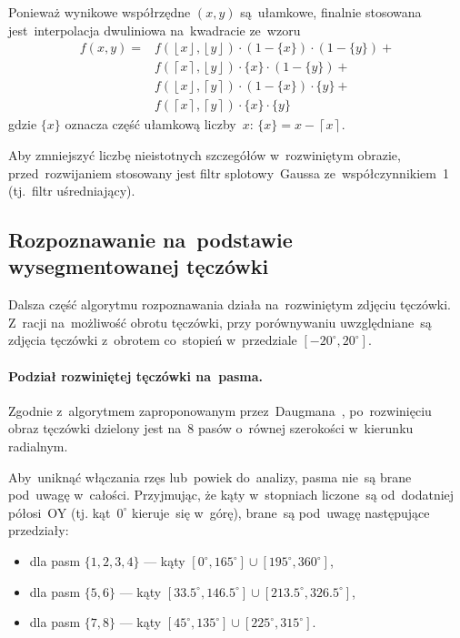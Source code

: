 \documentclass[11pt,a4paper]{article}
\begin{document}
Ponieważ wynikowe współrzędne $(x,y)$ są~ułamkowe, finalnie stosowana jest~interpolacja dwuliniowa na~kwadracie ze~wzoru
\begin{align*}
    f(x, y) = & f(\left\lfloor x \right\rfloor, \left\lfloor y \right\rfloor) \cdot (1 - \{ x \}) \cdot (1 - \{ y \}) + \\
    & f(\left\lceil x \right\rceil, \left\lfloor y \right\rfloor) \cdot \{ x \} \cdot (1 - \{ y \}) + \\
    & f(\left\lfloor x \right\rfloor, \left\lceil y \right\rceil) \cdot (1 - \{ x \}) \cdot \{ y \} + \\
    & f(\left\lceil x \right\rceil, \left\lceil y \right\rceil) \cdot \{ x \} \cdot \{ y \}
\end{align*}
gdzie $\{ x \}$ oznacza część ułamkową liczby~$x$: $\{ x \} = x - \left\lceil x \right\rceil$.

Aby zmniejszyć liczbę nieistotnych szczegółów w~rozwiniętym obrazie, przed~rozwijaniem stosowany jest filtr splotowy~Gaussa ze~współczynnikiem~1 (tj.~filtr uśredniający).

\subsection{Rozpoznawanie na~podstawie wysegmentowanej tęczówki}
\label{subsec:recognition}
Dalsza część algorytmu rozpoznawania działa na~rozwiniętym zdjęciu tęczówki.
Z~racji na~możliwość obrotu tęczówki, przy porównywaniu uwzględniane~są zdjęcia tęczówki z~obrotem co~stopień w~przedziale $[-20^\circ, 20^\circ]$.

\paragraph{Podział rozwiniętej tęczówki na~pasma.}
Zgodnie z~algorytmem zaproponowanym przez~Daugmana~\cite{slot2008}, po~rozwinięciu obraz tęczówki dzielony jest na~8 pasów o~równej szerokości w~kierunku radialnym.

Aby~uniknąć włączania rzęs lub~powiek do~analizy, pasma nie~są brane pod~uwagę w~całości.
Przyjmując, że kąty w~stopniach liczone~są od~dodatniej półosi~OY (tj. kąt~$0^\circ$ kieruje~się w~górę), brane~są pod~uwagę następujące przedziały:
\begin{itemize}
    \item dla pasm $\{ 1, 2, 3, 4 \}$ --- kąty $[0^\circ, 165^\circ] \cup [195^\circ, 360^\circ]$,
    \item dla pasm $\{ 5, 6 \}$ --- kąty $[33.5^\circ, 146.5^\circ] \cup [213.5^\circ, 326.5^\circ]$,
    \item dla pasm $\{ 7, 8 \}$ --- kąty $[45^\circ, 135^\circ] \cup [225^\circ, 315^\circ]$.
\end{itemize}
\end{document}
